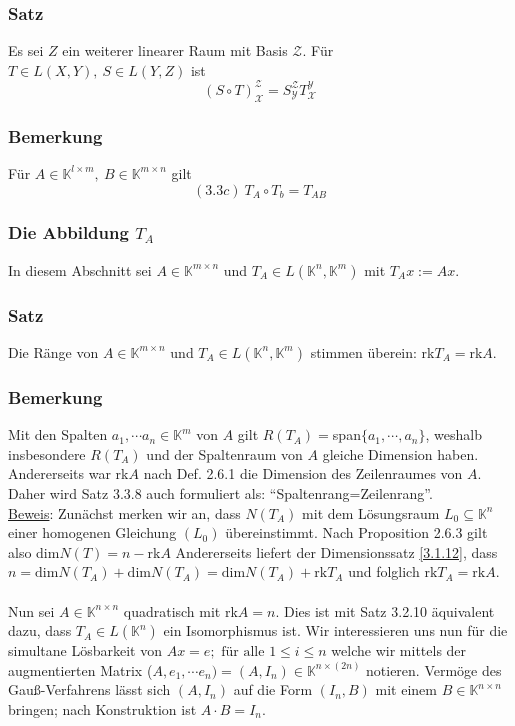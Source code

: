\subsubsection{Satz}
Es sei $Z$ ein weiterer linearer Raum mit Basis $\mathcal{Z}$.  Für $T\in L(X,Y),\ S\in L(Y,Z)$ ist
\[ (S\circ T)_\mathcal{X}^\mathcal{Z}=S_\mathcal{Y}^\mathcal{Z}T_\mathcal{X}^\mathcal{Y}\]
\subsubsection{Bemerkung}
Für $A\in\mathbb{K}^{l\times m},\ B\in\mathbb{K}^{m\times n}$ gilt
\[(3.3c)\ T_A\circ T_b=T_{AB}\]
\addtocounter{subsubsection}{-6}
\subsubsection{Die Abbildung $T_A$}
In diesem Abschnitt sei $A\in\mathbb{K}^{m\times n}$ und $T_A\in L(\mathbb{K}^n,\mathbb{K}^m)$ mit $T_Ax:=Ax$.
\addtocounter{subsubsection}{5}
\subsubsection{Satz}
Die Ränge von $A\in\mathbb{K}^{m\times n}$ und $T_A\in L(\mathbb{K}^n,\mathbb{K}^m)$ stimmen überein: rk$T_A=$rk$A$.
\subsubsection{Bemerkung}
Mit den Spalten $a_1,\cdots a_n\in \mathbb{K}^m$ von $A$ gilt $R(T_A)=$span$\{a_1,\cdots ,a_n\}$, weshalb insbesondere $R(T_A)$ und der Spaltenraum von $A$ gleiche Dimension haben.  Andererseits war rk$A$ nach Def. 2.6.1 die Dimension des Zeilenraumes von $A$.  Daher wird Satz 3.3.8 auch formuliert als: "`Spaltenrang=Zeilenrang"'.\\
\underline{Beweis}: Zunächst merken wir an, dass $N(T_A)$ mit dem Lösungsraum $L_0\subseteq \mathbb{K}^n$ einer homogenen Gleichung $(L_0)$ übereinstimmt.  Nach Proposition 2.6.3 gilt also dim$N(T)=n-$rk$A$ Andererseits liefert der Dimensionssatz \ref{3.1.12}, dass $n=\mathrm{dim}N(T_A)+\mathrm{dim}N(T_A)=\mathrm{dim}N(T_A)+\mathrm{rk}T_A$ und folglich $\mathrm{rk}T_A=\mathrm{rk}A$.\\\\
Nun sei $A\in\mathbb{K}^{n\times n}$ quadratisch mit rk$A=n$.  Dies ist mit Satz 3.2.10 äquivalent dazu, dass $T_A\in L(\mathbb{K}^n)$ ein Isomorphismus ist.  Wir interessieren uns nun für die simultane Lösbarkeit von
$Ax=e;\text{ für alle } 1\leq i\leq n$ welche wir mittels der augmentierten Matrix ($A,e_1,\cdots e_n)=(A,I_n)\in \mathbb{K}^{n\times (2n)}$ notieren.  Vermöge des Gauß-Verfahrens lässt sich $(A,I_n)$ auf die Form $(I_n,B)$ mit einem $B\in\mathbb{K}^{n\times n}$ bringen; nach Konstruktion ist $A\cdot B=I_n$.
